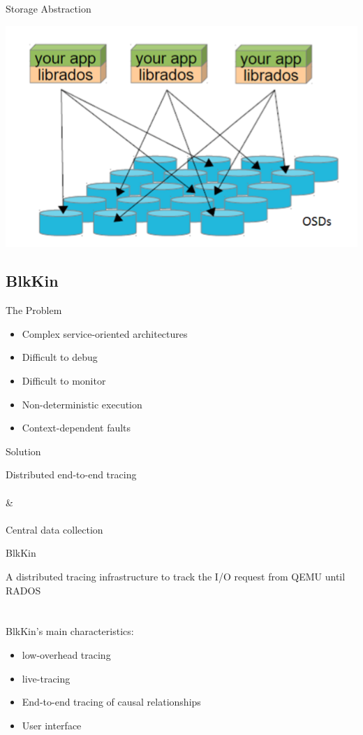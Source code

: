 \begin{frame}{Storage Abstraction}
\begin{center}
    \includegraphics[scale=0.3]{images/rados_abstraction.png} \\
\end{center}
\end{frame}

\subsection{BlkKin}
\begin{frame}{The Problem}
\begin{itemize}
\item Complex service-oriented architectures
\item Difficult to debug
\item Difficult to monitor
\item Non-deterministic execution
\item Context-dependent faults
\end{itemize}
\end{frame}

\begin{frame}{Solution}
\begin{center}
Distributed end-to-end tracing 
\hfill \\
\hfill \\
 \& 
\hfill \\
\hfill \\
Central data collection
\end{center}
\end{frame}

\begin{frame}{BlkKin}

A distributed tracing infrastructure to track the I/O request from QEMU until
RADOS
\hfill \\
\hfill \\
\hfill \\

BlkKin's main characteristics:
\begin{itemize}
\item low-overhead tracing 
\item live-tracing
\item End-to-end tracing of causal relationships
\item User interface
\end{itemize}
\end{frame}

